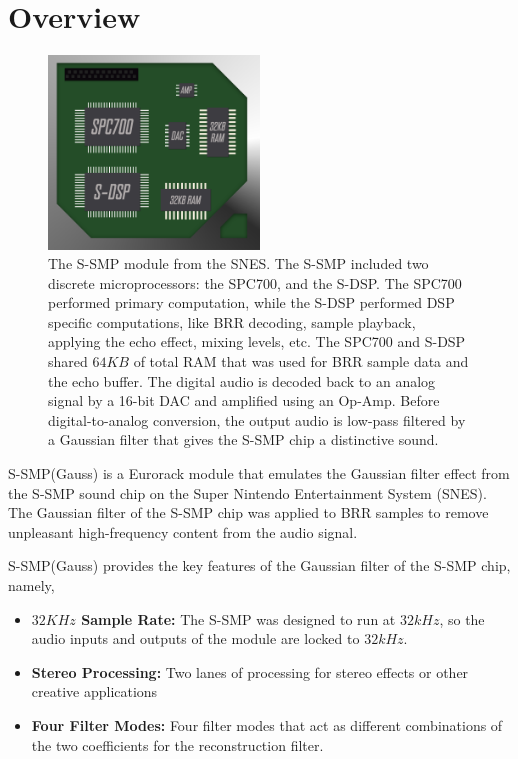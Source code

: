 \documentclass[12pt,letter]{article}
\begin{document}


\section{Overview}

\begin{figure}[!htp]
\centering
\includegraphics[width=0.5\textwidth]{S-SMP-Chip}
\caption{The S-SMP module from the SNES. The S-SMP included two discrete microprocessors: the SPC700, and the S-DSP. The SPC700 performed primary computation, while the S-DSP performed DSP specific computations, like BRR decoding, sample playback, applying the echo effect, mixing levels, etc. The SPC700 and S-DSP shared $64KB$ of total RAM that was used for BRR sample data and the echo buffer. The digital audio is decoded back to an analog signal by a 16-bit DAC and amplified using an Op-Amp. Before digital-to-analog conversion, the output audio is low-pass filtered by a Gaussian filter that gives the S-SMP chip a distinctive sound.}
\end{figure}

\clearpage

S-SMP(Gauss) is a Eurorack module that emulates the Gaussian filter effect from the S-SMP sound chip on the Super Nintendo Entertainment System (SNES). The Gaussian filter of the S-SMP chip was applied to BRR samples to remove unpleasant high-frequency content from the audio signal.

S-SMP(Gauss) provides the key features of the Gaussian filter of the S-SMP chip,
namely,
\begin{itemize}
  \item \textbf{$32KHz$ Sample Rate:} The S-SMP was designed to run at $32kHz$, so the audio inputs and outputs of the module are locked to $32kHz$.
  \item \textbf{Stereo Processing:} Two lanes of processing for stereo effects or other creative applications
  \item \textbf{Four Filter Modes:} Four filter modes that act as different combinations of the two coefficients for the reconstruction filter.
\end{itemize}
\end{document}
